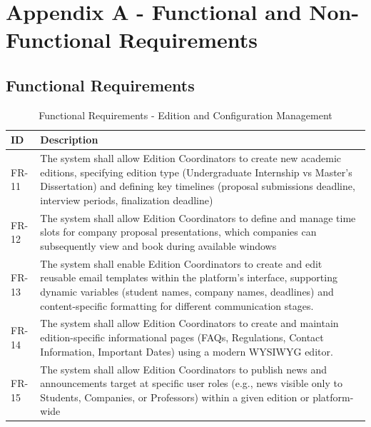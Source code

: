 %

\chapter{Appendix A - Functional and Non-Functional Requirements}
\label{ann:fr_nfr_appendix}

\section*{Functional Requirements}
{
    \begin{table}[H]
        \centering
        \caption{Functional Requirements - Edition and Configuration Management}
        \label{tab:freq-edition-config} 
        \begin{tabular}{|l|p{12cm}|} %
            \hline
            \textbf{ID} & \textbf{Description} \\ \hline
            FR-11 & The system shall allow Edition Coordinators to create new academic editions, specifying edition type (Undergraduate Internship vs Master’s Dissertation) and defining key timelines (proposal submissions deadline, interview periods, finalization deadline)\\ \hline
            FR-12 & The system shall allow Edition Coordinators to define and manage time slots for company proposal presentations, which companies can subsequently view and book during available windows \\ \hline
            FR-13 & The system shall enable Edition Coordinators to create and edit reusable email templates within the platform's interface, supporting dynamic variables (student names, company names, deadlines) and content-specific formatting for different communication stages. \\ \hline
            FR-14 & The system shall allow Edition Coordinators to create and maintain edition-specific informational pages (FAQs, Regulations, Contact Information, Important Dates) using a modern WYSIWYG editor. \\ \hline
            FR-15 & The system shall allow Edition Coordinators to publish news and announcements target at specific user roles (e.g., news visible only to Students, Companies, or Professors) within a given edition or platform-wide \\ \hline
        \end{tabular}
    \end{table}    
}

